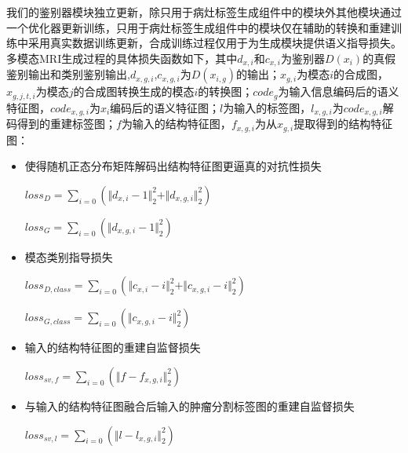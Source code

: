 \documentclass[letterpaper]{article} %
\begin{document}
我们的鉴别器模块独立更新，除只用于病灶标签生成组件中的模块外其他模块通过一个优化器更新训练，只用于病灶标签生成组件中的模块仅在辅助的转换和重建训练中采用真实数据训练更新，合成训练过程仅用于为生成模块提供语义指导损失。多模态MRI生成过程的具体损失函数如下，其中$d_{x,i}$和$c_{x,i}$为鉴别器$D(x_i)$的真假鉴别输出和类别鉴别输出,$d_{x,g,i}$,$c_{x,g,i}$为$D(x_{i,g})$的输出；$x_{g,i}$为模态$i$的合成图，$x_{g,j,t,i}$为模态$j$的合成图转换生成的模态$i$的转换图；$code_g$为输入信息编码后的语义特征图，$code_{x,g,i}$为$x_i$编码后的语义特征图；$l$为输入的标签图，$l_{x,g,i}$为$code_{x,g,i}$解码得到的重建标签图；$f$为输入的结构特征图，$f_{x,g,i}$为从$x_{g,i}$提取得到的结构特征图：

\begin{itemize}
	\item 使得随机正态分布矩阵解码出结构特征图更逼真的对抗性损失

\begin{center}
	$loss_{D}=\sum\limits_{i=0}(\Vert{d_{x,i}-1}\Vert_{2}^{2}+\Vert{d_{x,g,i}}\Vert_{2}^{2})$
\end{center}

\begin{center}
	$loss_{G}=\sum\limits_{i=0}(\Vert{d_{x,g,i}-1}\Vert_{2}^{2})$
\end{center}

	\item 模态类别指导损失

\begin{center}
	$loss_{D,class}=\sum\limits_{i=0}(\Vert{c_{x,i}-i}\Vert_{2}^{2}+\Vert{c_{x,g,i}-i}\Vert_{2}^{2})$
\end{center}

\begin{center}
	$loss_{G,class}=\sum\limits_{i=0}(\Vert{c_{x,g,i}-i}\Vert_{2}^{2})$
\end{center}

	\item 输入的结构特征图的重建自监督损失
	
\begin{center}
	$loss_{sv,f}=\sum\limits_{i=0}(\Vert{f-f_{x,g,i}}\Vert_{2}^{2})$
\end{center}

	\item 与输入的结构特征图融合后输入的肿瘤分割标签图的重建自监督损失
	
\begin{center}
	$loss_{sv,l}=\sum\limits_{i=0}(\Vert{l-l_{x,g,i}}\Vert_{2}^{2})$
\end{center}


\end{itemize}
\end{document}

